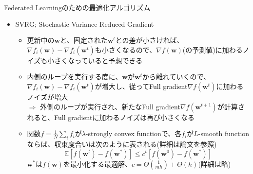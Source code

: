 \documentclass[dvipdfmx,notheorems,t]{beamer}
\begin{document}
\begin{frame}{Federated Learningのための最適化アルゴリズム}

\begin{itemize}
	\item SVRG; Stochastic Variance Reduced Gradient
	\begin{itemize}
		\item 更新中の$\bm{w}$と、固定された$\bm{w}^t$との差が小さければ、$\nabla f_i(\bm{w}) - \nabla f_i(\bm{w}^t)$も小さくなるので、$\nabla f(\bm{w})$(の予測値)に加わるノイズも小さくなっていると予想できる
		\newline
		
		\item 内側のループを実行する度に、$\bm{w}$が$\bm{w}^t$から離れていくので、$\nabla f_i(\bm{w}) - \nabla f_i(\bm{w}^t)$が増大し、従ってFull gradient$\nabla f(\bm{w}^t)$に加わるノイズが増大 \\
		$\Rightarrow$ 外側のループが実行され、新たなFull gradient$\nabla f(\bm{w}^{t + 1})$が計算されると、Full gradientに加わるノイズは再び小さくなる
		\newline
		
		\item 関数$f = \frac{1}{N} \sum_i f_i$が$\lambda$-strongly convex functionで、各$f_i$が$L$-smooth functionならば、収束度合いは次のように表される(詳細は論文を参照)
		\begin{equation}
			\mathbb{E} \left[ f(\bm{w}^t) - f(\bm{w}^*) \right] \le c^t \left[ f(\bm{w}^0) - f(\bm{w}^*) \right]
		\end{equation}
		$\bm{w}^*$は$f(\bm{w})$を最小化する最適解、$c = \Theta \left( \frac{1}{mh} \right) + \Theta(h)$(詳細は略)
	\end{itemize}
\end{itemize}

\end{frame}
\end{document}
